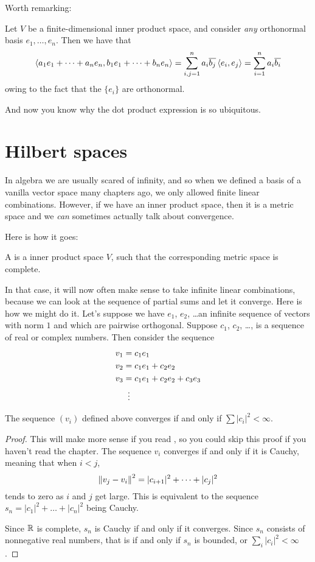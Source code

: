 Worth remarking:
\begin{example}
	Let $V$ be a finite-dimensional inner product space,
	and consider \emph{any} orthonormal basis $e_1, \dots, e_n$.
	Then we have that
	\[ \left< a_1 e_1 + \dots + a_n e_n,
		b_1 e_1 + \dots + b_n e_n \right>
		= \sum_{i,j=1}^n a_i\overline{b_j} \left< e_i, e_j \right>
		= \sum_{i=1}^n a_i \overline{b_i} \]
	owing to the fact that the $\{e_i\}$ are orthonormal.
\end{example}
And now you know why the dot product expression is so ubiquitous.

\section{Hilbert spaces}
In algebra we are usually scared of infinity,
and so when we defined a basis of a vanilla vector space many chapters ago,
we only allowed finite linear combinations.
However, if we have an inner product space,
then it is a metric space and we \emph{can}
sometimes actually talk about convergence.

Here is how it goes:
\begin{definition}
	A  is a inner product space $V$,
	such that the corresponding metric space is complete.
\end{definition}

In that case, it will now often make sense to take infinite linear combinations,
because we can look at the sequence of partial sums and let it converge.
Here is how we might do it.
Let's suppose we have $e_1$, $e_2$, \dots an infinite sequence
of vectors with norm $1$ and which are pairwise orthogonal.
Suppose $c_1$, $c_2$, \dots, is a sequence of real or complex numbers.
Then consider the sequence
\begin{align*}
	v_1 &= c_1 e_1 \\
	v_2 &= c_1 e_1 + c_2 e_2 \\
	v_3 &= c_1 e_1 + c_2 e_2 + c_3 e_3 \\
	&\vdotswithin=
\end{align*}

\begin{proposition}
	The sequence $(v_i)$ defined above
	converges if and only if $\sum \left\lvert c_i \right\rvert^2 < \infty$.
\end{proposition}
\begin{proof}
	This will make more sense if you read ,
	so you could skip this proof if you haven't read the chapter.
	The sequence $v_i$ converges if and only if it is Cauchy,
	meaning that when $i < j$,
	\[ \left\lVert v_j - v_i \right\rVert^2 = |c_{i+1}|^2 + \dots + |c_j|^2 \]
	tends to zero as $i$ and $j$ get large.
	This is equivalent to the sequence
	$s_n = |c_1|^2 + \dots + |c_n|^2$ being Cauchy.

	Since $\mathbb R$ is complete, $s_n$ is Cauchy
	if and only if it converges.
	Since $s_n$ consists of nonnegative real numbers,
	that is if and only if $s_n$ is bounded,
	or $\sum_i \left\lvert c_i \right\rvert^2 < \infty$.
\end{proof}

